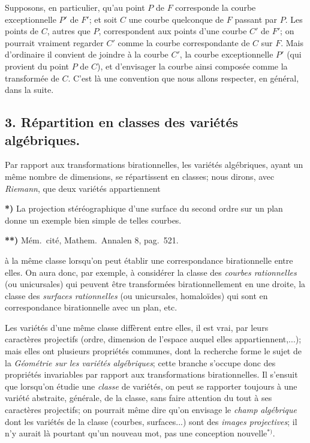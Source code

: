 \documentclass{article}
\begin{document}
Supposons, en particulier, qu'au point $P$ de $F$ corresponde la courbe exceptionnelle $P'$ de $F'$; et soit $C$ une courbe quelconque de $F$ passant par $P$. Les points de $C$, autres que $P$, correspondent aux points d'une courbe $C'$ de $F'$; on pourrait vraiment regarder $C'$ comme la courbe correspondante de $C$ sur $F$. Mais d'ordinaire il convient de joindre à la courbe $C'$, la courbe exceptionnelle $P'$ (qui provient du point $P$ de $C$), et d'envisager la courbe ainsi composée comme la transformée de $C$. C'est là une convention que nous allons respecter, en général, dans la suite.

\subsection*{3. Répartition en classes des variétés algébriques.}

Par rapport aux transformations birationnelles, les variétés algébriques, ayant un même nombre de dimensions, se répartissent en classes; nous dirons, avec \emph{Riemann}, que deux variétés appartiennent

\textbf{*)} La projection stéréographique d'une surface du second ordre sur un plan donne un exemple bien simple de telles courbes.

\textbf{**)} Mém.\ cité, Mathem.\ Annalen 8, pag.\ 521.

à la même classe lorsqu'on peut établir une correspondance birationnelle entre elles. On aura donc, par exemple, à considérer la classe des \emph{courbes rationnelles} (ou unicursales) qui peuvent être transformées birationnellement en une droite, la classe des \emph{surfaces rationnelles} (ou unicursales, homaloïdes) qui sont en correspondance birationnelle avec un plan, etc.

Les variétés d'une même classe diffèrent entre elles, il est vrai, par leurs caractères projectifs (ordre, dimension de l'espace auquel elles appartiennent,...); mais elles ont plusieurs propriétés communes, dont la recherche forme le sujet de la \emph{Géométrie sur les variétés algébriques}; cette branche s'occupe donc des propriétés invariables par rapport aux transformations birationnelles. Il s'ensuit que lorsqu'on étudie une \emph{classe} de variétés, on peut se rapporter toujours à une variété abstraite, générale, de la classe, sans faire attention du tout à ses caractères projectifs; on pourrait même dire qu'on envisage le \emph{champ algébrique} dont les variétés de la classe (courbes, surfaces...) sont des \emph{images projectives}; il n'y aurait là pourtant qu'un nouveau mot, pas une conception nouvelle${}^{*)}$.
\end{document}

